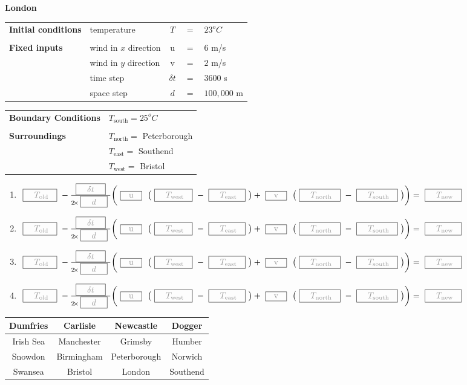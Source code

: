 \begin{slide}{}

\everymath{\displaystyle}
\newcommand{\gbox}[1]{~\boxed{\color{grey} #1}~}
\newcommand{\timeStep}
{
$
\gbox{~~~T_\text{old}~~}
-\frac{\gbox{~~~\delta t~~~}}{2\tims\gbox{~~~d~~~}}
\biggl(\gbox{~~\text{u}~~} ~\bigl( \gbox{~~~T_\text{west}~~}
                          - \gbox{~~~T_\text{east}~~} \bigr)
+      \gbox{~~\text{v}~~} ~\bigl( \gbox{~~~T_\text{north}~~}
                          - \gbox{~~~T_\text{south}~~} \bigr)
\biggr)
= \gbox{~~~T_\text{new}~~}$
}

\newcommand{\workSheet}[6]
{
\begin{center}
{\normalsize\bf #1}

\small
\begin{minipage}[t]{0.5\linewidth}
\begin{tabular}[t]{llccl}
\bf Initial conditions    & temperature  & $T$ & $=$    & $#2^oC$\\ \\
\bf Fixed inputs & wind in $x$ direction & u   & $=$    & $#3$ m/s\\
             & wind in $y$ direction & v   & $=$    & $#4$ m/s\\
             & time step             & $\delta t$ & $=$ & $3600$ s \\
             & space step            & $d$        & $=$ & $100,000$ m
\end{tabular}
\end{minipage}
\begin{minipage}[t]{0.48\linewidth}
\begin{tabular}[t]{ll}
\bf Boundary Conditions & #5 \\ \\
\bf Surroundings        & #6
\end{tabular}
\end{minipage}
\begin{enumerate}
\item \timeStep
\item \timeStep
\item \timeStep
\item \timeStep
\end{enumerate}

\begin{tabular}{|c|c|c|c|}
\hline Dumfries & Carlisle & Newcastle & Dogger \\
\hline Irish Sea & Manchester & Grimsby & Humber \\
\hline Snowdon & Birmingham & Peterborough & Norwich \\
\hline Swansea & Bristol & London & Southend \\ \hline
\end{tabular}
\end{center}
}

\parskip 0pt
\workSheet{London}{23}{6}{2}{$T_\text{south} = 25^oC$}
          {$T_\text{north} = $ Peterborough \\& $T_\text{east} = $ Southend \\&
          $T_\text{west} = $ Bristol}

\end{slide}

